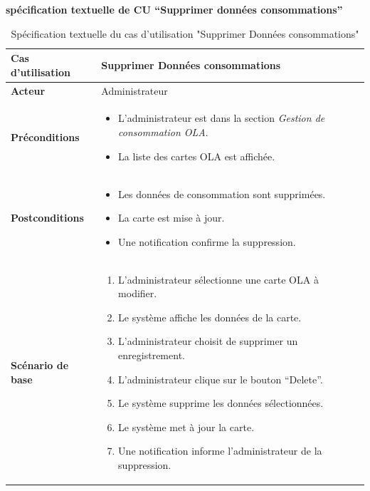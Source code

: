\documentclass[a4paper,11pt]{report}
\begin{document}
\newpage
\textbf{spécification textuelle de CU “Supprimer données consommations”
}

\begin{table}[H]
  \centering
  \renewcommand{\arraystretch}{1.5}
  \caption{Spécification textuelle du cas d'utilisation "Supprimer Données consommations"}
  \begin{tabularx}{\textwidth}{|l|X|}
    \hline
    \textbf{Cas d'utilisation} & Supprimer Données consommations \\ \hline
    \textbf{Acteur} & Administrateur \\ \hline
    \textbf{Préconditions} & 
    \begin{itemize}
      \item L'administrateur est dans la section \textit{Gestion de consommation OLA}.
      \item La liste des cartes OLA est affichée.
    \end{itemize} \\ \hline
    \textbf{Postconditions} & 
    \begin{itemize}
      \item Les données de consommation sont supprimées.
      \item La carte est mise à jour.
      \item Une notification confirme la suppression.
    \end{itemize} \\ \hline
    \textbf{Scénario de base} & 
    \begin{enumerate}
      \item L’administrateur sélectionne une carte OLA à modifier.
      \item Le système affiche les données de la carte.
      \item L’administrateur choisit de supprimer un enregistrement.
      \item L’administrateur clique sur le bouton “Delete”.
      \item Le système supprime les données sélectionnées.
      \item Le système met à jour la carte.
      \item Une notification informe l’administrateur de la suppression.
    \end{enumerate} \\ \hline
  \end{tabularx}
\end{table}


\begingroup
\setlength{\parskip}{0.5em}
\setlength{\parindent}{0pt}
\end{document}
